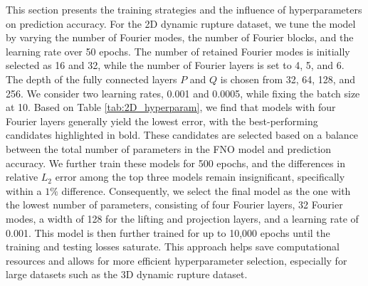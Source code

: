 \documentclass[draft]{agujournal2019}
\begin{document}
This section presents the training strategies and the influence of hyperparameters on prediction accuracy. For the 2D dynamic rupture dataset, we tune the model by varying the number of Fourier modes, the number of Fourier blocks, and the learning rate over 50 epochs. The number of retained Fourier modes is initially selected as 16 and 32, while the number of Fourier layers is set to 4, 5, and 6. The depth of the fully connected layers \(P\) and \(Q\) is chosen from 32, 64, 128, and 256. We consider two learning rates, 0.001 and 0.0005, while fixing the batch size at 10. Based on Table \ref{tab:2D_hyperparam}, we find that models with four Fourier layers generally yield the lowest error, with the best-performing candidates highlighted in bold. These candidates are selected based on a balance between the total number of parameters in the FNO model and prediction accuracy. We further train these models for 500 epochs, and the differences in relative \(L_2\) error among the top three models remain insignificant, specifically within a \(1\%\) difference. Consequently, we select the final model as the one with the lowest number of parameters, consisting of four Fourier layers, 32 Fourier modes, a width of 128 for the lifting and projection layers, and a learning rate of 0.001. This model is then further trained for up to 10,000 epochs until the training and testing losses saturate. This approach helps save computational resources and allows for more efficient hyperparameter selection, especially for large datasets such as the 3D dynamic rupture dataset. 
\end{document}
